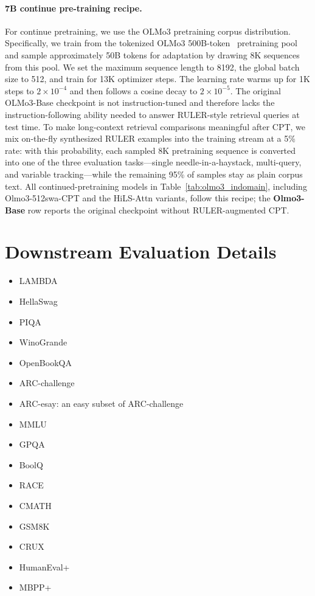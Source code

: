 \paragraph{7B continue pre-training recipe.} For continue pretraining, we use the OLMo3 pretraining corpus distribution. Specifically, we train from the tokenized OLMo3 500B-token~\citep{allenai_dolma3_mix_6t} pretraining pool and sample approximately 50B tokens for adaptation by drawing 8K sequences from this pool. We set the maximum sequence length to 8192, the global batch size to 512, and train for 13K optimizer steps. The learning rate warms up for 1K steps to $2\times10^{-4}$ and then follows a cosine decay to $2\times10^{-5}$.
The original OLMo3-Base checkpoint is not instruction-tuned and therefore lacks the instruction-following ability needed to answer RULER-style retrieval queries at test time.
To make long-context retrieval comparisons meaningful after CPT, we mix on-the-fly synthesized RULER examples into the training stream at a 5\% rate: with this probability, each sampled 8K pretraining sequence is converted into one of the three evaluation tasks---single needle-in-a-haystack, multi-query, and variable tracking---while the remaining 95\% of samples stay as plain corpus text.
All continued-pretraining models in Table~\ref{tab:olmo3_indomain}, including Olmo3-512swa-CPT and the HiLS-Attn variants, follow this recipe; the \textbf{Olmo3-Base} row reports the original checkpoint without RULER-augmented CPT.

\section{Downstream Evaluation Details}\label{apdx:benchmarks}
\begin{itemize}[leftmargin=*,itemsep=0.2em,topsep=0.3em]
    \item LAMBDA~\cite{paperno2016lambada}
    \item HellaSwag~\cite{zellers2019hellaswag}
    \item PIQA~\cite{bisk2020piqa}
    \item WinoGrande~\cite{sakaguchi2021winogrande}
    \item OpenBookQA~\cite{mihaylov2018can}
    \item ARC-challenge~\cite{clark2018think}
    \item ARC-esay: an easy subset of ARC-challenge
    \item MMLU~\cite{hendryckstest2021}
    \item GPQA~\cite{rein2024gpqa}
    \item BoolQ~\cite{clark2019boolq}
    \item RACE~\cite{lai-etal-2017-race}
    \item CMATH~\cite{wei2023cmathlanguagemodelpass}
    \item GSM8K~\cite{cobbe2021gsm8k}
    \item CRUX~\cite{gu2024cruxevalbenchmarkcodereasoning}
    \item HumanEval+~\cite{evalplus,evalperf}
    \item MBPP+~\cite{evalplus,austin2021programsynthesislargelanguage}
\end{itemize}

